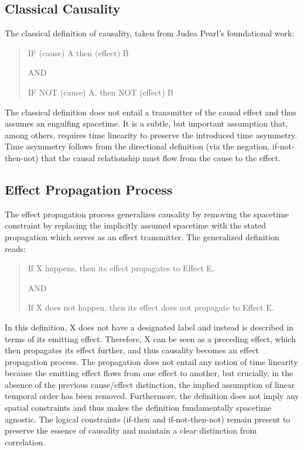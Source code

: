 \subsection{Classical Causality}
\label{subsec:Classical_Causality}

The classical definition of causality, taken from Judea Pearl's foundational work\cite{pearl2009causality}:


\begin{quote}
\begin{center}
        IF (cause) A then (effect) B

    AND 
    
    IF NOT (cause) A, then NOT (effect) B
\end{center}
\end{quote}


The classical definition does not entail a transmitter of the causal effect and thus assumes an engulfing spacetime. It is a subtle, but important assumption that, among others, requires time linearity to preserve the introduced time asymmetry. Time asymmetry follows from the directional definition (via the negation, if-not-then-not) that the causal relationship must flow from the cause to the effect.


\subsection{Effect Propagation Process}
\label{subsec:Effect_Propagation_Process}

The effect propagation process\cite{Hansen2025EPP} generalizes causality by removing the spacetime constraint by replacing the implicitly assumed spacetime with the stated propagation which serves as an effect transmitter. The generalized definition reads:

\begin{quote}
\begin{center}
        If X happens, then its effect propagates to Effect E.
    
    AND
    
    If X does not happen, then its effect does not propagate to Effect E.
\end{center}
\end{quote}


In this definition, X does not have a designated label and instead is described in terms of its emitting effect. Therefore, X can be seen as a preceding effect, which then propagates its effect further, and thus causality becomes an effect propagation process. The propagation does not entail any notion of time linearity because the emitting effect flows from one effect to another, but crucially, in the absence of the previous cause/effect distinction, the implied assumption of linear temporal order has been removed.
Furthermore, the definition does not imply any spatial constraints and thus makes the definition fundamentally spacetime agnostic. The logical constraints (if-then and if-not-then-not) remain present to preserve the essence of causality and maintain a clear distinction from correlation.

